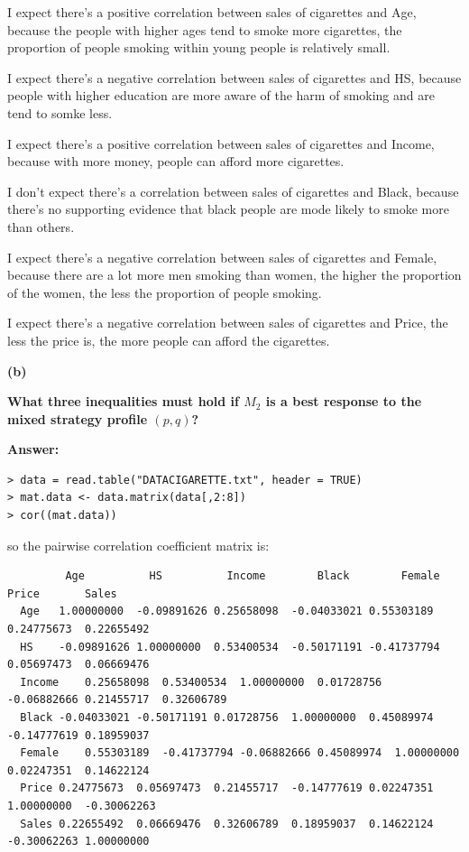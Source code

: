 \documentclass[letterpaper,11pt]{article}
\begin{document}
I expect there's a positive correlation between sales of cigarettes and Age, because the people with higher ages tend to smoke more cigarettes, the proportion of people smoking within young people is relatively small.\par
I expect there's a negative correlation between sales of cigarettes and HS, because people with higher education are more aware of the harm of smoking and are tend to somke less.\par
I expect there's a positive correlation between sales of cigarettes and Income, because with more money, people can afford more cigarettes.\par
I don't expect there's a correlation between sales of cigarettes and Black, because there's no supporting evidence that black people are mode likely to smoke more than others.\par
I expect there's a negative correlation between sales of cigarettes and Female, because there are a lot more men smoking than women, the higher the proportion of the women, the less the proportion of people smoking.\par
I expect there's a negative correlation between sales of cigarettes and Price, the less the price is, the more people can afford the cigarettes.\par


\begin{addmargin}[-1.1em]{0em}
\textbf{(b)}\par\end{addmargin}
  \textbf{What three inequalities must hold if $M_2$ is a best response to the mixed strategy profile $(p,q)$?}\par
\bigbreak
\begin{addmargin}[-0.5em]{0em}
\textbf{Answer: }\end{addmargin}



\begin{lstlisting}
> data = read.table("DATACIGARETTE.txt", header = TRUE)
> mat.data <- data.matrix(data[,2:8])
> cor((mat.data))
\end{lstlisting}
so the pairwise correlation coefficient matrix is:
\begin{lstlisting}
         Age	      HS	      Income	    Black	     Female	    Price	    Sales
  Age	1.00000000	-0.09891626	0.25658098	-0.04033021	0.55303189	0.24775673	0.22655492
  HS	-0.09891626	1.00000000	0.53400534	-0.50171191	-0.41737794	0.05697473	0.06669476
  Income	0.25658098	0.53400534	1.00000000	0.01728756	-0.06882666	0.21455717	0.32606789
  Black	-0.04033021	-0.50171191	0.01728756	1.00000000	0.45089974	-0.14777619	0.18959037
  Female	0.55303189	-0.41737794	-0.06882666	0.45089974	1.00000000	0.02247351	0.14622124
  Price	0.24775673	0.05697473	0.21455717	-0.14777619	0.02247351	1.00000000	-0.30062263
  Sales	0.22655492	0.06669476	0.32606789	0.18959037	0.14622124	-0.30062263	1.00000000
\end{lstlisting}
\end{document}
